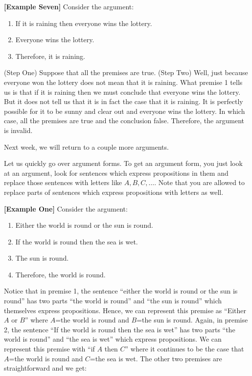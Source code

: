 \documentclass[
]{book}
\providecommand{\tightlist}{%
  \setlength{\itemsep}{0pt}\setlength{\parskip}{0pt}}
\begin{document}
\textbf{{[}Example Seven{]}} Consider the argument:

\begin{enumerate}
\def\labelenumi{\arabic{enumi}.}
\tightlist
\item
  If it is raining then everyone wins the lottery.
\item
  Everyone wins the lottery.
\item
  Therefore, it is raining.
\end{enumerate}

(Step One) Suppose that all the premises are true. (Step Two) Well, just because everyone won the lottery does not mean that it is raining. What premise 1 tells us is that if it is raining then we must conclude that everyone wins the lottery. But it does not tell us that it is in fact the case that it is raining. It is perfectly possible for it to be sunny and clear out and everyone wins the lottery. In which case, all the premises are true and the conclusion false. Therefore, the argument is invalid.

Next week, we will return to a couple more arguments.

Let us quickly go over argument forms. To get an argument form, you just look at an argument, look for sentences which express propositions in them and replace those sentences with letters like \(A,B,C,\ldots\). Note that you are allowed to replace parts of sentences which express propositions with letters as well.

\textbf{{[}Example One{]}} Consider the argument:

\begin{enumerate}
\def\labelenumi{\arabic{enumi}.}
\tightlist
\item
  Either the world is round or the sun is round.
\item
  If the world is round then the sea is wet.
\item
  The sun is round.
\item
  Therefore, the world is round.
\end{enumerate}

Notice that in premise 1, the sentence ``either the world is round or the sun is round'' has two parts ``the world is round'' and ``the sun is round'' which themselves express propositions. Hence, we can represent this premise as ``Either \(A\) or \(B\)'' where \(A\)=the world is round and \(B\)=the sun is round. Again, in premise 2, the sentence ``If the world is round then the sea is wet'' has two parts ``the world is round'' and ``the sea is wet'' which express propositions. We can represent this premise with ``if \(A\) then \(C\)'' where it continues to be the case that \(A\)=the world is round and \(C\)=the sea is wet. The other two premises are straightforward and we get:
\end{document}
